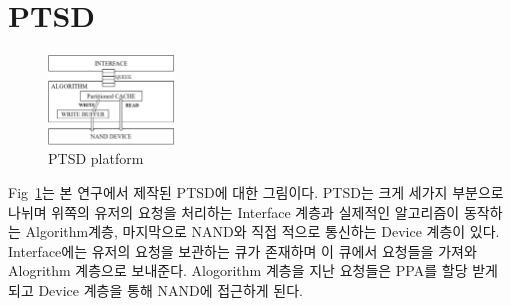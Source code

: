 \documentclass[conference]{IEEEtran}
\begin{document}
\section{PTSD}
\begin{figure}[h]
	\centering
	\includegraphics[width=0.3\textwidth]{image/PTSD/PTSD.png}
	\caption{PTSD platform}
	\label{fig:PTSD}
\end{figure}
Fig~\ref{fig:PTSD}는 본 연구에서 제작된 PTSD에 대한 그림이다. PTSD는 크게 세가지 부분으로 나뉘며 위쪽의 유저의 요청을 처리하는 Interface 계층과 실제적인 알고리즘이 동작하는 Algorithm계층, 마지막으로 NAND와 직접 적으로 통신하는 Device 계층이 있다. Interface에는 유저의 요청을 보관하는 큐가 존재하며 이 큐에서 요청들을 가져와 Alogrithm 계층으로 보내준다. Alogorithm 계층을 지난 요청들은 PPA를 할당 받게 되고 Device 계층을 통해 NAND에 접근하게 된다.
\end{document}
